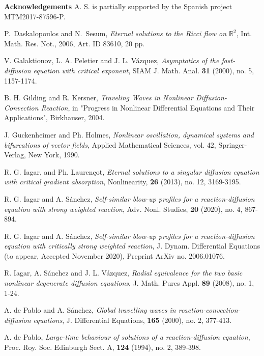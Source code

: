 \documentclass[a4paper,11pt]{article}
\numberwithin{equation}{section}
\newcommand{\real}{\mathbb{R}}
\let\ced=\c         %
\begin{document}
\bigskip

\noindent \textbf{Acknowledgements} A. S. is partially supported by the Spanish project MTM2017-87596-P.



\begin{thebibliography}{1}

P.~Daskalopoulos and N.~Sesum, \emph{Eternal solutions to the Ricci flow on $\real^2$}, Int. Math. Res. Not.,  2006, Art. ID 83610, 20 pp.

V. Galaktionov, L. A. Peletier and J. L. V\'azquez, \emph{Asymptotics of
the fast-diffusion equation with critical exponent}, SIAM J. Math.
Anal. \textbf{31} (2000), no. 5, 1157-1174.

B. H. Gilding and R. Kersner, \emph{Traveling Waves in Nonlinear Diffusion-Convection Reaction}, in "Progress in Nonlinear Differential Equations and Their Applications", Birkhauser, 2004.

J. Guckenheimer and Ph. Holmes, \emph{Nonlinear oscillation, dynamical systems and bifurcations of vector fields}, Applied Mathematical Sciences, vol. 42, Springer-Verlag, New York, 1990.

R. G. Iagar, and Ph. Lauren\ced{c}ot, \emph{Eternal solutions to a singular diffusion equation with critical gradient absorption}, Nonlinearity, \textbf{26} (2013), no. 12, 3169-3195.

R. G. Iagar and A. S\'anchez, \emph{Self-similar blow-up profiles for a reaction-diffusion equation with strong weighted reaction}, Adv. Nonl. Studies, \textbf{20} (2020), no. 4, 867-894.

R. G. Iagar and A. S\'anchez, \emph{Self-similar blow-up profiles for a reaction-diffusion equation with critically strong weighted reaction}, J. Dynam. Differential Equations (to appear, Accepted November 2020), Preprint ArXiv no. 2006.01076.

R. Iagar, A. S\'anchez and J. L. V\'azquez, \emph{Radial equivalence for
the two basic nonlinear degenerate diffusion equations}, J. Math.
Pures Appl. \textbf{89} (2008), no. 1, 1-24.

A. de Pablo and A. S\'anchez, \emph{Global travelling waves in reaction-convection-diffusion equations}, J. Differential Equations, \textbf{165} (2000), no. 2, 377-413.

A. de Pablo, \emph{Large-time behaviour of solutions of a reaction-diffusion equation}, Proc. Roy. Soc. Edinburgh Sect. A, \textbf{124} (1994), no. 2, 389-398.


\end{thebibliography}
\end{document}
